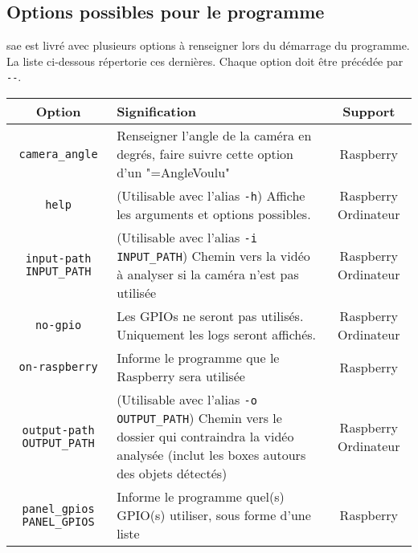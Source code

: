 \subsection{Options possibles pour le programme}
\label{sec:executionOption_clearWay}
\gls{sae} est livré avec plusieurs options à renseigner lors du démarrage du programme. La liste ci-dessous répertorie ces dernières.
Chaque option doit être précédée par \verb=--=.
\begin{table}[H]
    \centering
    \begin{tabularx}{\linewidth}{|c|X|c|}
        \hline
        \rowcolor{tableColorDark} Option & Signification & Support   \\
        \hline
        \verb=camera_angle=                          & Renseigner l'angle de la caméra en degrés, faire suivre cette option d'un "=AngleVoulu"                                                                           & Raspberry               \\\hline
        \verb=help=                                  & (Utilisable avec l'alias \verb=-h=) Affiche les arguments et options possibles.                                                                                   & Raspberry Ordinateur    \\\hline
        \verb=input-path INPUT_PATH=                 & (Utilisable avec l'alias \verb=-i INPUT_PATH=) Chemin vers la vidéo à analyser si la caméra n'est pas utilisée                                                    & Raspberry Ordinateur    \\\hline
        \verb=no-gpio=                               & Les GPIOs ne seront pas utilisés. Uniquement les logs seront affichés.                                                                                            & Raspberry Ordinateur    \\\hline
        \verb=on-raspberry=                          & Informe le programme que le Raspberry sera utilisée                                                                                                               & Raspberry               \\\hline
        \verb=output-path OUTPUT_PATH=               & (Utilisable avec l'alias \verb=-o OUTPUT_PATH=) Chemin vers le dossier qui contraindra la vidéo analysée (inclut les boxes autours des objets détectés)           & Raspberry Ordinateur    \\\hline
        \verb=panel_gpios PANEL_GPIOS=               & Informe le programme quel(s) GPIO(s) utiliser, sous forme d'une liste                                                                                             & Raspberry               \\\hline

\end{tabularx}
\end{table}
